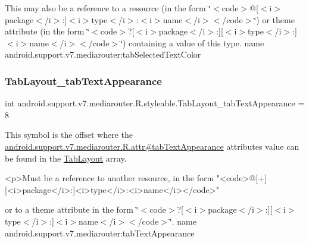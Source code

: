 This may also be a reference to a resource (in the form \char`\"{}$<$code$>$@\mbox{[}$<$i$>$package$<$/i$>$\+:\mbox{]}$<$i$>$type$<$/i$>$\+:$<$i$>$name$<$/i$>$$<$/code$>$\char`\"{}) or theme attribute (in the form \char`\"{}$<$code$>$?\mbox{[}$<$i$>$package$<$/i$>$\+:\mbox{]}\mbox{[}$<$i$>$type$<$/i$>$\+:\mbox{]}$<$i$>$name$<$/i$>$$<$/code$>$\char`\"{}) containing a value of this type.  name android.\+support.\+v7.\+mediarouter\+:tab\+Selected\+Text\+Color \mbox{\label{classandroid_1_1support_1_1v7_1_1mediarouter_1_1R_1_1styleable_a6fa243786142fa47217b312962fc4848}} 
\subsubsection{\texorpdfstring{Tab\+Layout\+\_\+tab\+Text\+Appearance}{TabLayout\_tabTextAppearance}}
{\footnotesize\ttfamily int android.\+support.\+v7.\+mediarouter.\+R.\+styleable.\+Tab\+Layout\+\_\+tab\+Text\+Appearance = 8\hspace{0.3cm}{\ttfamily [static]}}

This symbol is the offset where the \hyperlink{classandroid_1_1support_1_1v7_1_1mediarouter_1_1R_1_1attr_ab402c331d81c2362a8853eb204ebc309}{android.\+support.\+v7.\+mediarouter.\+R.\+attr\#tab\+Text\+Appearance} attribute\textquotesingle{}s value can be found in the \hyperlink{classandroid_1_1support_1_1v7_1_1mediarouter_1_1R_1_1styleable_a94de1350e0a902b4a974d775f2f4f25e}{Tab\+Layout} array.

\begin{DoxyVerb}      <p>Must be a reference to another resource, in the form "<code>@[+][<i>package</i>:]<i>type</i>:<i>name</i></code>"
\end{DoxyVerb}
 or to a theme attribute in the form \char`\"{}$<$code$>$?\mbox{[}$<$i$>$package$<$/i$>$\+:\mbox{]}\mbox{[}$<$i$>$type$<$/i$>$\+:\mbox{]}$<$i$>$name$<$/i$>$$<$/code$>$\char`\"{}.  name android.\+support.\+v7.\+mediarouter\+:tab\+Text\+Appearance \mbox{\label{classandroid_1_1support_1_1v7_1_1mediarouter_1_1R_1_1styleable_a0fcf5d47b23b3827d92116fbdb4b4028}} 
